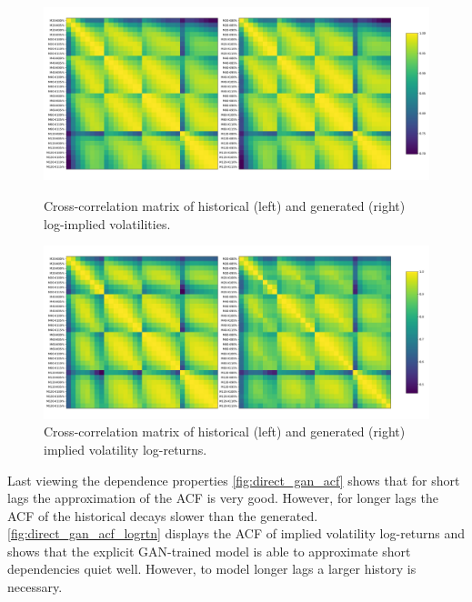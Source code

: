 \documentclass[]{article} %
\begin{document}
\begin{figure}[!htb]
    \centering
    \begin{minipage}{.45\textwidth}
        \centering
        \includegraphics[width=\textwidth]{figures/imp_vol/plot/cross_corr.pdf}
        \caption{Cross-correlation matrix of historical (left) and generated (right) log-implied volatilities.}
       \label{fig:cross_correlation_log_ivs}
    \end{minipage}%
	\hfill
    \begin{minipage}{.45\textwidth}
        \centering
        \includegraphics[width=\textwidth]{figures/imp_vol/plot/cross_corr_logrtn.pdf}
        \caption{Cross-correlation matrix of historical (left) and generated (right) implied volatility log-returns.}
       \label{fig:cross_correlation_iv_logrtn}
    \end{minipage}
\end{figure}

Last viewing the dependence properties \autoref{fig:direct_gan_acf} shows that for short lags the approximation of the ACF is very good. However, for longer lags the ACF of the historical decays slower than the generated. \autoref{fig:direct_gan_acf_logrtn} displays the ACF of implied volatility log-returns and shows that the explicit GAN-trained model is able to approximate short dependencies quiet well. However, to model longer lags a larger history is necessary.
\end{document}
